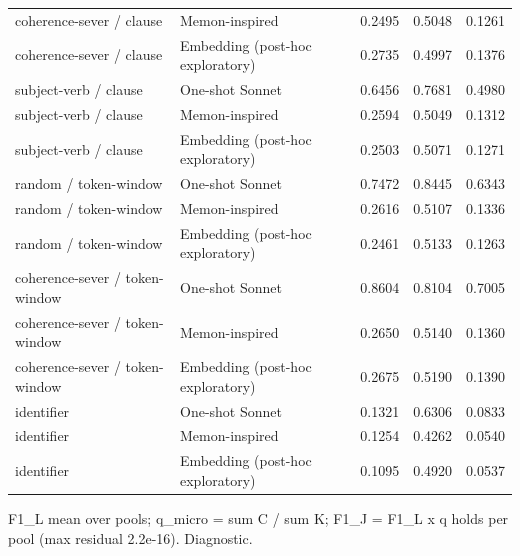 \begin{table}[t]
{\begin{tabular}{lllll}
coherence-sever / clause & Memon-inspired & 0.2495 & 0.5048 & 0.1261 \\
coherence-sever / clause & Embedding (post-hoc exploratory) & 0.2735 & 0.4997 & 0.1376 \\
subject-verb / clause & One-shot Sonnet & 0.6456 & 0.7681 & 0.4980 \\
subject-verb / clause & Memon-inspired & 0.2594 & 0.5049 & 0.1312 \\
subject-verb / clause & Embedding (post-hoc exploratory) & 0.2503 & 0.5071 & 0.1271 \\
random / token-window & One-shot Sonnet & 0.7472 & 0.8445 & 0.6343 \\
random / token-window & Memon-inspired & 0.2616 & 0.5107 & 0.1336 \\
random / token-window & Embedding (post-hoc exploratory) & 0.2461 & 0.5133 & 0.1263 \\
coherence-sever / token-window & One-shot Sonnet & 0.8604 & 0.8104 & 0.7005 \\
coherence-sever / token-window & Memon-inspired & 0.2650 & 0.5140 & 0.1360 \\
coherence-sever / token-window & Embedding (post-hoc exploratory) & 0.2675 & 0.5190 & 0.1390 \\
identifier & One-shot Sonnet & 0.1321 & 0.6306 & 0.0833 \\
identifier & Memon-inspired & 0.1254 & 0.4262 & 0.0540 \\
identifier & Embedding (post-hoc exploratory) & 0.1095 & 0.4920 & 0.0537 \\
\bottomrule
\end{tabular}}
\par\smallskip\parbox{\linewidth}{\tiny F1\_L mean over pools; q\_micro = sum C / sum K; F1\_J = F1\_L x q holds per pool (max residual 2.2e-16). Diagnostic.}
\end{table}
